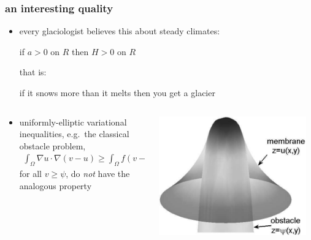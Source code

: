 \documentclass[hide notes,intlimits]{beamer}
\begin{document}
\begin{frame}
  \frametitle{an interesting quality} 
\begin{itemize}
\item every glaciologist believes this about steady climates:
\begin{center}
 if $a>0$ on $R$ then $H>0$ on $R$
\end{center}
that is:
\begin{center}
 if it snows more than it melts then you get a glacier
\end{center}
\end{itemize}
\begin{columns}
\begin{column}{0.6\textwidth}
\begin{itemize}
\small
\item uniformly-elliptic variational inequalities, e.g.~the classical obstacle problem,
\begin{align*}
\int_{\Omega}  \nabla u \cdot \nabla (v - u)  \ge  \int_{\Omega} f (v - u),
\end{align*}
for all $v\ge \psi$, do \emph{not} have the analogous property
\end{itemize}
\end{column}
\begin{column}{0.35\textwidth}
\includegraphics[width=0.95\textwidth]{classicalobs}
\end{column}
\end{columns}
\end{frame}
\end{document}
